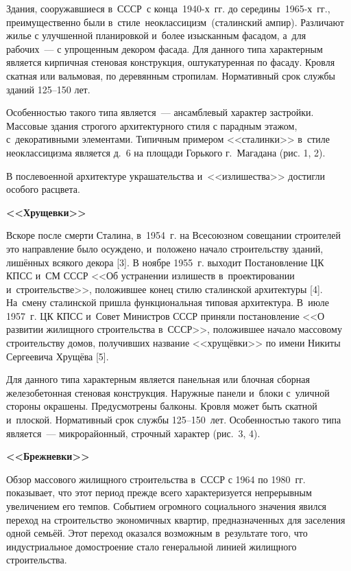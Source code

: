 Здания, сооружавшиеся в СССР с конца 1940-х~гг. до середины 1965-х~гг., преимущественно были в~стиле неоклассицизм (сталинский ампир). Различают жилье с улучшенной планировкой и~более изысканным фасадом, а~для рабочих~--- с упрощенным декором фасада. Для данного типа характерным является кирпичная стеновая конструкция, оштукатуренная по фасаду. Кровля скатная или вальмовая, по деревянным стропилам. Нормативный срок службы зданий 125--150 лет.

Особенностью такого типа является~--- ансамблевый характер застройки. Массовые здания строгого архитектурного стиля с парадным этажом, с~декоративными элементами. Типичным примером <<сталинки>> в~стиле неоклассицизма является д.~6 на площади Горького г.~Магадана (рис. 1, 2).

В послевоенной архитектуре украшательства и~<<излишества>> достигли особого расцвета.


\vspace{-0.5cm}
\textbf{<<Хрущевки>>}

Вскоре после смерти Сталина, в~1954~г. на Всесоюзном совещании строителей это направление было осуждено, и~положено начало строительству зданий, лишённых всякого декора [3].  В ноябре 1955~г. выходит Постановление ЦК КПСС и~СМ СССР <<Об устранении излишеств в~проектировании и~строительстве>>, положившее конец стилю сталинской архитектуры [4]. На~смену сталинской пришла функциональная типовая архитектура. В~июле 1957~г. ЦК КПСС и~Совет Министров СССР приняли постановление <<О развитии жилищного строительства в~СССР>>, положившее начало массовому строительству домов, получивших название <<хрущёвки>> по имени Никиты Сергеевича Хрущёва [5].

Для данного типа характерным является панельная или блочная сборная железобетонная стеновая конструкция. Наружные панели и~блоки с~уличной стороны окрашены. Предусмотрены балконы.  Кровля может быть скатной и~плоской. Нормативный срок службы 125--150~лет. Особенностью такого типа является~--- микрорайонный, строчный характер (рис.~3, 4).



\textbf{<<Брежневки>>}

Обзор массового жилищного строительства в~СССР с 1964 по 1980~гг. показывает, что этот период прежде всего характеризуется непрерывным увеличением его темпов. Событием огромного социального значения явился переход на строительство экономичных квартир, предназначенных для заселения одной семьёй. Этот переход оказался возможным в~результате того, что индустриальное домостроение стало генеральной линией жилищного строительства.

